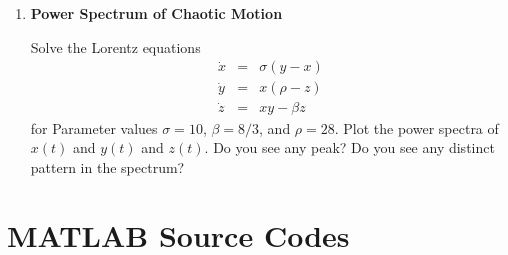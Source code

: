\begin{enumerate}[labelwidth=0.5cm,labelindent=0cm,leftmargin=*,label=\bfseries \thechapter.\arabic*,align=left]

\item \textbf{Power Spectrum of Chaotic Motion}

\medskip
\noindent
Solve the Lorentz equations
\begin{subequations}
\begin{eqnarray}
\dot{x} &=& \sigma (y-x)\\
\dot{y} &=& x (\rho - z) \\
\dot{z} &=& x y - \beta z
\end{eqnarray}
\end{subequations}
for Parameter values $\sigma=10$, $\beta=8/3$, and $\rho=28$.  Plot the power spectra of $x(t)$ and $y(t)$ and $z(t)$.  Do you see any peak?
Do you see any distinct pattern in the spectrum?  
\newpage

\end{enumerate}

\newpage
\section*{MATLAB Source Codes}


